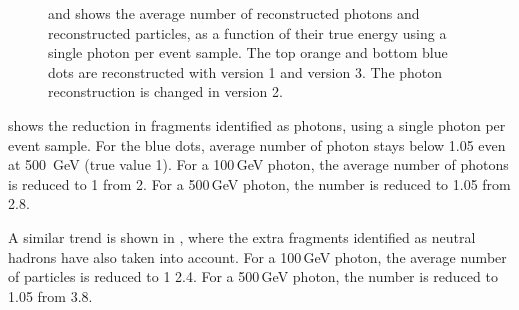 \begin{figure}[tbph]
\begin{subfigure}[b]{0.45\textwidth}
        \caption{}
        \label{fig:photonSingleN_all}
    \end{subfigure}
\caption[Average number of reconstructed photons and reconstructed particles, as a function of their true energy using single photon sample.]
{ and  shows the average number of reconstructed photons and reconstructed particles, as a function of their true energy using a single photon per event sample. The top orange and bottom blue dots are reconstructed with \pandora version 1 and version 3. The photon reconstruction is changed in \pandora version 2.}
\label{fig:photonSingleN}
\end{figure}


 shows the reduction in fragments identified as photons, using a single photon per event sample. For the blue dots, average number of photon stays below 1.05 even at 500 \,GeV (true value 1). For a 100\,GeV photon, the average number of photons is reduced to 1 from 2. For a 500\,GeV photon, the  number is reduced to 1.05 from 2.8.

A similar trend is shown in , where the extra fragments identified as neutral hadrons have also taken into account. For a 100\,GeV photon, the average number of particles is reduced to 1 2.4. For a 500\,GeV photon, the number is reduced to 1.05 from 3.8.

